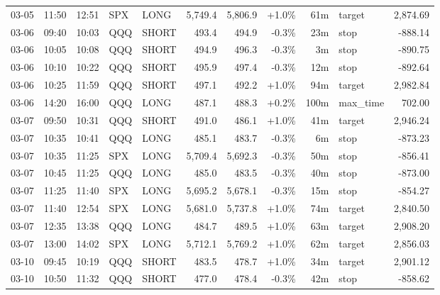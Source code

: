 \documentclass[11pt,a4paper,twoside]{article}
\begin{document}
\begin{center}
\begin{longtable}{>{\color{txtmain}}l l l l l r r r r >{\color{txtmain}}l r}
03-05 & 11:50 & 12:51 & SPX & LONG & 5,749.4 & 5,806.9 & \textcolor{wingreen}{+1.0\%} & 61m & target & \textcolor{wingreen}{2,874.69} \\
03-06 & 09:40 & 10:03 & QQQ & SHORT & 493.4 & 494.9 & \textcolor{lossred}{-0.3\%} & 23m & stop & \textcolor{lossred}{-888.14} \\
03-06 & 10:05 & 10:08 & QQQ & SHORT & 494.9 & 496.3 & \textcolor{lossred}{-0.3\%} & 3m & stop & \textcolor{lossred}{-890.75} \\
03-06 & 10:10 & 10:22 & QQQ & SHORT & 495.9 & 497.4 & \textcolor{lossred}{-0.3\%} & 12m & stop & \textcolor{lossred}{-892.64} \\
03-06 & 10:25 & 11:59 & QQQ & SHORT & 497.1 & 492.2 & \textcolor{wingreen}{+1.0\%} & 94m & target & \textcolor{wingreen}{2,982.84} \\
03-06 & 14:20 & 16:00 & QQQ & LONG & 487.1 & 488.3 & \textcolor{wingreen}{+0.2\%} & 100m & max\_time & \textcolor{wingreen}{702.00} \\
03-07 & 09:50 & 10:31 & QQQ & SHORT & 491.0 & 486.1 & \textcolor{wingreen}{+1.0\%} & 41m & target & \textcolor{wingreen}{2,946.24} \\
03-07 & 10:35 & 10:41 & QQQ & LONG & 485.1 & 483.7 & \textcolor{lossred}{-0.3\%} & 6m & stop & \textcolor{lossred}{-873.23} \\
03-07 & 10:35 & 11:25 & SPX & LONG & 5,709.4 & 5,692.3 & \textcolor{lossred}{-0.3\%} & 50m & stop & \textcolor{lossred}{-856.41} \\
03-07 & 10:45 & 11:25 & QQQ & LONG & 485.0 & 483.5 & \textcolor{lossred}{-0.3\%} & 40m & stop & \textcolor{lossred}{-873.00} \\
03-07 & 11:25 & 11:40 & SPX & LONG & 5,695.2 & 5,678.1 & \textcolor{lossred}{-0.3\%} & 15m & stop & \textcolor{lossred}{-854.27} \\
03-07 & 11:40 & 12:54 & SPX & LONG & 5,681.0 & 5,737.8 & \textcolor{wingreen}{+1.0\%} & 74m & target & \textcolor{wingreen}{2,840.50} \\
03-07 & 12:35 & 13:38 & QQQ & LONG & 484.7 & 489.5 & \textcolor{wingreen}{+1.0\%} & 63m & target & \textcolor{wingreen}{2,908.20} \\
03-07 & 13:00 & 14:02 & SPX & LONG & 5,712.1 & 5,769.2 & \textcolor{wingreen}{+1.0\%} & 62m & target & \textcolor{wingreen}{2,856.03} \\
03-10 & 09:45 & 10:19 & QQQ & SHORT & 483.5 & 478.7 & \textcolor{wingreen}{+1.0\%} & 34m & target & \textcolor{wingreen}{2,901.12} \\
03-10 & 10:50 & 11:32 & QQQ & SHORT & 477.0 & 478.4 & \textcolor{lossred}{-0.3\%} & 42m & stop & \textcolor{lossred}{-858.62} \\

\end{longtable}
\end{center}
\end{document}
